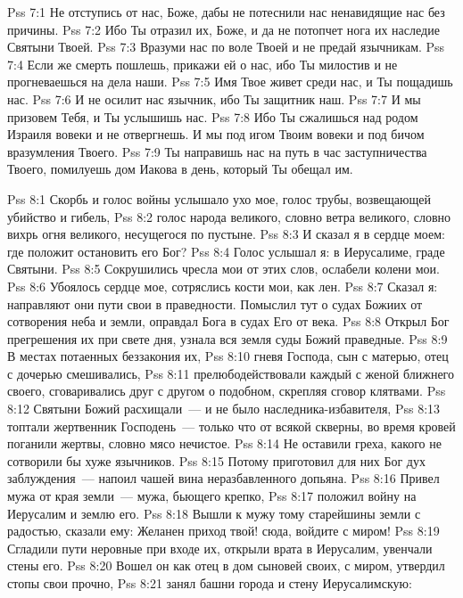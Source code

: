 \vs Pss 7:1
Не отступись от нас, Боже, дабы не потеснили нас ненавидящие
нас без причины.
\vs Pss 7:2
Ибо Ты отразил их, Боже, и да не потопчет нога их наследие
Святыни Твоей.
\vs Pss 7:3
Вразуми нас по воле Твоей и не предай язычникам.
\vs Pss 7:4
Если же смерть пошлешь, прикажи ей о нас, ибо Ты милостив и не
прогневаешься на дела наши.
\vs Pss 7:5
Имя Твое живет среди нас, и Ты пощадишь нас.
\vs Pss 7:6
И не осилит нас язычник, ибо Ты защитник наш.
\vs Pss 7:7
И мы призовем Тебя, и Ты услышишь нас.
\vs Pss 7:8
Ибо Ты сжалишься над родом Израиля вовеки и не отвергнешь.
И мы под игом Твоим вовеки и под бичом вразумления Твоего.
\vs Pss 7:9
Ты направишь нас на путь в час заступничества Твоего, помилуешь
дом Иакова в день, который Ты обещал им.

\vs Pss 8:1
Скорбь и голос войны услышало ухо мое, голос трубы, возвещающей
убийство и гибель,
\vs Pss 8:2
голос народа великого, словно ветра великого, словно вихрь огня
великого, несущегося по пустыне.
\vs Pss 8:3
И сказал я в сердце моем: где положит остановить его Бог?
\vs Pss 8:4
Голос услышал я: в Иерусалиме, граде Святыни.
\vs Pss 8:5
Сокрушились чресла мои от этих слов, ослабели колени мои.
\vs Pss 8:6
Убоялось сердце мое, сотряслись кости мои, как лен.
\vs Pss 8:7
Сказал я: направляют они пути свои в праведности. Помыслил тут
о судах Божиих от сотворения неба и земли, оправдал Бога в судах Его от
века.
\vs Pss 8:8
Открыл Бог прегрешения их при свете дня, узнала вся земля суды
Божий праведные.
\vs Pss 8:9
В местах потаенных беззакония их,
\vs Pss 8:10
гневя Господа, сын с матерью, отец с дочерью смешивались,
\vs Pss 8:11
прелюбодействовали каждый с женой ближнего своего, сговаривались
друг с другом о подобном, скрепляя сговор клятвами.
\vs Pss 8:12
Святыни Божий расхищали~--- и не было наследника-избавителя,
\vs Pss 8:13
топтали жертвенник Господень~--- только что от всякой
скверны, во время кровей поганили жертвы, словно мясо нечистое.
\vs Pss 8:14
Не оставили греха, какого не сотворили бы хуже язычников.
\vs Pss 8:15
Потому приготовил для них Бог дух заблуждения~--- напоил чашей
вина неразбавленного допьяна.
\vs Pss 8:16
Привел мужа от края земли~--- мужа, бьющего крепко,
\vs Pss 8:17
положил войну на Иерусалим и землю его.
\vs Pss 8:18
Вышли к мужу тому старейшины земли с радостью, сказали ему: Желанен
приход твой! сюда, войдите с миром!
\vs Pss 8:19
Сгладили пути неровные при входе их, открыли врата в Иерусалим,
увенчали стены его.
\vs Pss 8:20
Вошел он как отец в дом сыновей своих, с миром, утвердил стопы свои
прочно,
\vs Pss 8:21
занял башни города и стену Иерусалимскую:
